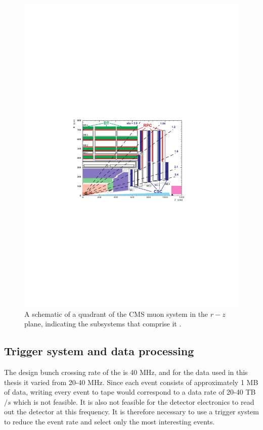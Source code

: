 \begin{figure}
  \includegraphics[width=1.2\largefigwidth]{plots/detector/muon_layout.pdf}
  \caption{A schematic of a quadrant of the CMS muon system in the $r-z$ plane, indicating the subsystems that comprise it \cite{Bayatian:922757}.}
  \label{fig:muonschematic}
\end{figure}

\subsection{Trigger system and data processing}
\label{sec:triggers}
The design bunch crossing rate of the \LHC is 40 MHz, and for the data used in this thesis it varied from 20-40 MHz. Since each event consists of approximately 1 MB of data, writing every event to tape would correspond to a data rate of 20-40 TB$/s$ which is not feasible. It is also not feasible for the detector electronics to read out the detector at this frequency. It is therefore necessary to use a trigger system to reduce the event rate and select only the most interesting events.

